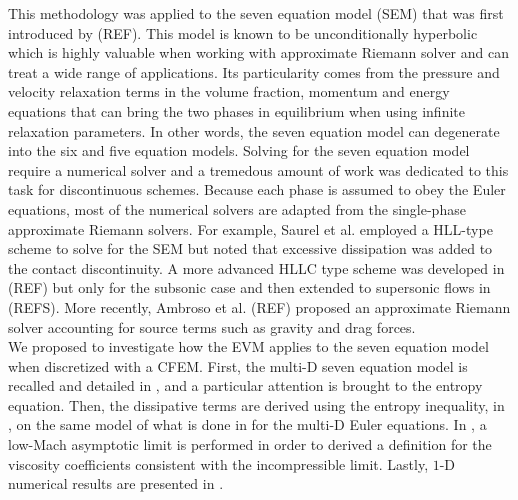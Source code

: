 This methodology was applied to the seven equation model (SEM) that was first introduced by (REF). This model is known to be unconditionally hyperbolic which is highly valuable when working with approximate Riemann solver and can treat a wide range of applications. Its particularity comes from the pressure and velocity relaxation terms in the volume fraction, momentum and energy equations that can bring the two phases in equilibrium when using infinite relaxation parameters. In other words, the seven equation model can degenerate into the six and five equation models. Solving for the seven equation model require a numerical solver and a tremedous amount of work was dedicated to this task for discontinuous schemes. Because each phase is assumed to obey the Euler equations, most of the numerical solvers are adapted from the single-phase approximate Riemann solvers. For example, Saurel et al. employed a HLL-type scheme to solve for the SEM but noted that excessive dissipation was added to the contact discontinuity. A more advanced HLLC type scheme was developed in (REF) but only for the subsonic case and then extended to supersonic flows in (REFS). More recently, Ambroso et al. (REF) proposed an approximate Riemann solver accounting for source terms such as gravity and drag forces.\\

 We proposed to investigate how the EVM applies to the seven equation model when discretized with a CFEM. First, the multi-D seven equation model is recalled and detailed in , and a particular attention is brought to the entropy equation. Then, the dissipative terms are derived using the entropy inequality, in , on the same model of what is done in  for the multi-D Euler equations. In , a low-Mach asymptotic limit is performed in order to derived a definition for the viscosity coefficients consistent with the incompressible limit. Lastly, $1$-D numerical results are presented in .
